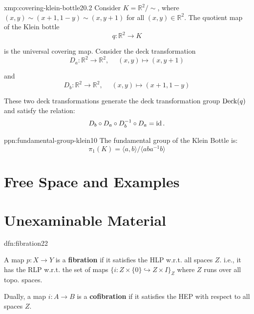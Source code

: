 \documentclass[landscape, 8pt]{extarticle}
\begin{document}
\begin{multicols*}{3}
\vspace{-7pt}
\begin{xmp}{xmp:covering-klein-bottle}{20.2}
	\vspace{-2pt}
	Consider $K = \mathbb{R}^{2} / \sim$, where $(x, y) \sim (x + 1, 1 - y) \sim (x, y+1)$ for all $(x, y)\in \mathbb{R}^{2}$. The quotient map of the Klein bottle
	\vspace{-4pt}
	\[q : \mathbb{R}^{2} \to K\]
	\par\vspace{-3pt}
	is the universal covering map. Consider the deck transformation
	\vspace{-1pt}
	\[D_{a} : \mathbb{R}^{2} \to \mathbb{R}^{2},\;\quad (x, y) \mapsto (x, y+1)\]
	\par\vspace{-3pt}
	and
	\vspace{-3pt}
	\[D_{b} : \mathbb{R}^{2} \to \mathbb{R}^{2},\;\quad (x, y) \mapsto (x+1, 1-y)\]
	\par\vspace{-3pt}
	These two deck transformations generate the deck transformation group $\operatorname{Deck}(q)$ and satisfy the relation:
	\vspace{-3pt}
	\[D_{b} \circ D_{a} \circ D_{b}^{-1} \circ D_{a} = \operatorname{id}.\]
\end{xmp}

\vspace{-7pt}
\begin{ppn}{ppn:fundamental-group-klein}{10}
	\vspace{-2pt}
	The fundamental group of the Klein Bottle is:
	\vspace{-2pt}
	\[\pi_{1}(K) = \langle a, b \rangle / \langle aba^{-1}b \rangle\]
\end{ppn}

\newpage
\section{Free Space and Examples}

\newpage
\section{Unexaminable Material}
\begin{dfn}[Fibration]{dfn:fibration}{22}
	\vspace{-2pt}
	\begin{enumerate-zero}
	    \item A map $p : X \to Y$ is a \textbf{fibration} if it satisfies the HLP w.r.t. all spaces $Z$. i.e., it has the RLP w.r.t. the set of maps $\{ i : Z \times \{0\} \hookrightarrow Z \times I\}_{Z}$ where $Z$ runs over all topo. spaces.
	    \item Dually, a map $i : A \to B$ is a \textbf{cofibration} if it satisfies the HEP with respect to all spaces $Z$.
	\end{enumerate-zero}
\end{dfn}


\end{multicols*}
\end{document}
